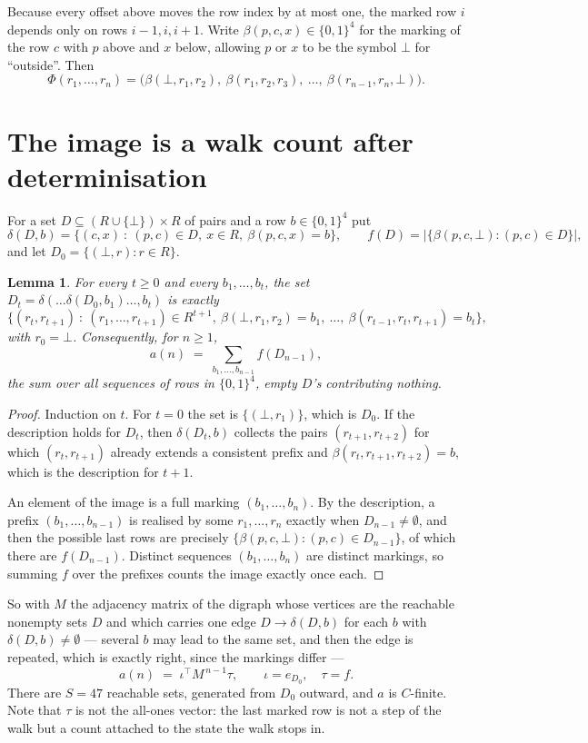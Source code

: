 \documentclass[11pt,a4paper]{article}
\theoremstyle{plain}
\newtheorem{lemma}[theorem]{Lemma}
\theoremstyle{definition}
\begin{document}
Because every offset above moves the row index by at most one, the marked row $i$ depends only
on rows $i-1,i,i+1$. Write $\beta(p,c,x)\in\{0,1\}^{4}$ for the marking of the row $c$
with $p$ above and $x$ below, allowing $p$ or $x$ to be the symbol $\bot$ for ``outside''.
Then
\[
\Phi(r_1,\dots,r_n)=\bigl(\beta(\bot,r_1,r_2),\ \beta(r_1,r_2,r_3),\ \dots,\
\beta(r_{n-1},r_n,\bot)\bigr).
\]

\section{The image is a walk count after determinisation}

For a set $D\subseteq(R\cup\{\bot\})\times R$ of pairs and a row $b\in\{0,1\}^{4}$ put
\[
\delta(D,b)=\{(c,x)\ :\ (p,c)\in D,\ x\in R,\ \beta(p,c,x)=b\},\qquad
f(D)=\bigl|\{\beta(p,c,\bot):(p,c)\in D\}\bigr| ,
\]
and let $D_0=\{(\bot,r):r\in R\}$.

\begin{lemma}\label{lem:det}
For every $t\ge0$ and every $b_1,\dots,b_t$, the set
$D_t=\delta(\dots\delta(D_0,b_1)\dots,b_t)$ is exactly
\[
\{(r_t,r_{t+1})\ :\ (r_1,\dots,r_{t+1})\in R^{t+1},\ \beta(\bot,r_1,r_2)=b_1,\ \dots,\
\beta(r_{t-1},r_t,r_{t+1})=b_t\} ,
\]
with $r_0=\bot$. Consequently, for $n\ge1$,
\[
a(n)\;=\;\sum_{b_1,\dots,b_{n-1}}f(D_{n-1}),
\]
the sum over all sequences of rows in $\{0,1\}^{4}$, empty $D$'s contributing nothing.
\end{lemma}

\begin{proof}
Induction on $t$. For $t=0$ the set is $\{(\bot,r_1)\}$, which is $D_0$. If the description
holds for $D_t$, then $\delta(D_t,b)$ collects the pairs $(r_{t+1},r_{t+2})$ for which
$(r_t,r_{t+1})$ already extends a consistent prefix and
$\beta(r_t,r_{t+1},r_{t+2})=b$, which is the description for $t+1$.

An element of the image is a full marking $(b_1,\dots,b_n)$. By the description, a prefix
$(b_1,\dots,b_{n-1})$ is realised by some $r_1,\dots,r_n$ exactly when $D_{n-1}\neq
\emptyset$, and then the possible last rows are precisely
$\{\beta(p,c,\bot):(p,c)\in D_{n-1}\}$, of which there are $f(D_{n-1})$. Distinct
sequences $(b_1,\dots,b_n)$ are distinct markings, so summing $f$ over the prefixes counts the
image exactly once each.
\end{proof}

So with $M$ the adjacency matrix of the digraph whose vertices are the reachable nonempty sets
$D$ and which carries one edge $D\to\delta(D,b)$ for each $b$ with $\delta(D,b)\neq\emptyset$
--- several $b$ may lead to the same set, and then the edge is repeated, which is exactly
right, since the markings differ ---
\[
a(n)\;=\;\iota^{\!\top}M^{\,n-1}\tau,\qquad \iota=e_{D_0},\quad \tau=f .
\]
There are $S=47$ reachable sets, generated from $D_0$ outward, and $a$ is $C$-finite. Note
that $\tau$ is not the all-ones vector: the last marked row is not a step of the walk but a
count attached to the state the walk stops in.
\end{document}

